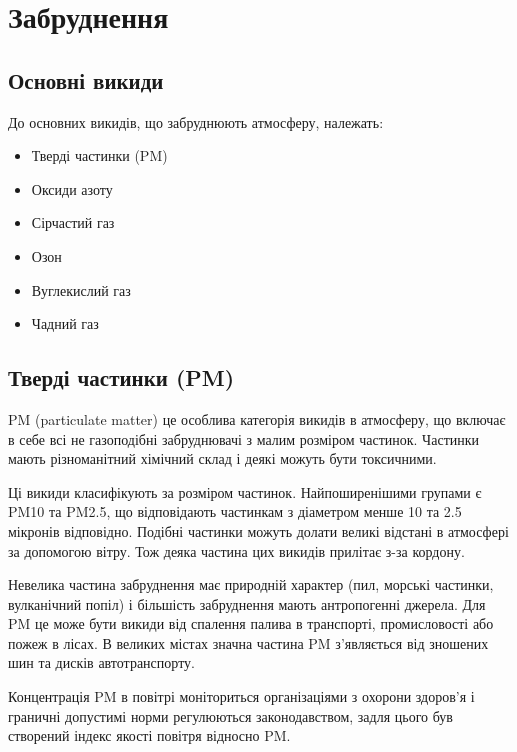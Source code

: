 \chapter{Забруднення}

\section{Основні викиди}

До основних викидів, що забруднюють атмосферу, належать:
\begin{itemize}
    \item Тверді частинки (PM)
    \item Оксиди азоту
    \item Сірчастий газ
    \item Озон
    \item Вуглекислий газ
    \item Чадний газ
\end{itemize}

\section{Тверді частинки (PM)}

PM (particulate matter) це особлива категорія викидів в атмосферу, що включає в себе всі не газоподібні забруднювачі 
з малим розміром частинок. Частинки мають різноманітний хімічний склад і деякі можуть бути 
токсичними. 

Ці викиди класифікують за розміром частинок. Найпоширенішими групами є PM10 та PM2.5, 
що відповідають частинкам з діаметром менше 10 та 2.5 мікронів відповідно. 
Подібні частинки можуть долати великі відстані в атмосфері за допомогою вітру. 
Тож деяка частина цих викидів прилітає з-за кордону. \cite{noauthor_dusts_nodate}

Невелика частина забруднення має природній характер (пил, морські частинки, вулканічний попіл) і більшість забруднення мають антропогенні джерела. 
Для PM це може бути викиди від спалення палива в транспорті, промисловості або пожеж в лісах. 
В великих містах значна частина PM з'являється від зношених шин та дисків автотранспорту. 

Концентрація PM в повітрі моніториться організаціями з охорони здоров'я і граничні 
допустимі норми регулюються законодавством, задля цього був створений індекс якості повітря 
відносно PM.\cite{noauthor__nodate}


